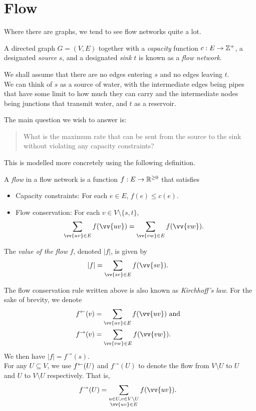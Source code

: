 \section{Flow}

Where there are graphs, we tend to see flow networks quite a lot.

\begin{fdef}
	A directed graph $G=(V,E)$ together with a \textit{capacity} function $c:E\to\mathbb{Z}^+$, a designated \textit{source} $s$, and a designated \textit{sink} $t$ is known as a \textit{flow network}.
\end{fdef}

We shall assume that there are no edges entering $s$ and no edges leaving $t$.\\
We can think of $s$ as a source of water, with the intermediate edges being pipes that have some limit to how much they can carry and the intermediate nodes being junctions that transmit water, and $t$ as a reservoir.

The main question we wish to answer is:
\begin{quote}
	What is the maximum rate that can be sent from the source to the sink without violating any capacity constraints?
\end{quote}

This is modelled more concretely using the following definition.

\begin{fdef}[Flow]
	A \textit{flow} in a flow network is a function $f:E\to\mathbb{R}^{\geq 0}$ that satisfies
	\begin{itemize}
		\item Capacity constraints: For each $e\in E$, $f(e)\leq c(e)$.
		\item Flow conservation: For each $v\in V\setminus\{s,t\}$,
		\[ \sum_{\vv{uv}\in E} f(\vv{uv}) = \sum_{\vv{vw}\in E} f(\vv{vw}). \]
	\end{itemize}
	The \textit{value of the flow} $f$, denoted $|f|$, is given by
	\[ |f| = \sum_{\vv{sv}\in E} f(\vv{sv}). \]
\end{fdef}

The flow conservation rule written above is also known as \textit{Kirchhoff's law}. For the sake of brevity, we denote
\begin{align*}
	f^{\ot}(v) &= \sum_{\vv{uv}\in E} f(\vv{uv}) \text{ and} \\
	f^{\to}(v) &= \sum_{\vv{vw}\in E} f(\vv{vw}).
\end{align*}
We then have $|f|=f^{\to}(s)$.\\
For any $U\subseteq V$, we use $f^{\leftarrow}(U)$ and $f^{\to}(U)$ to denote the flow from $V\setminus U$ to $U$ and $U$ to $V\setminus U$ respectively. That is,
\[ f^\to(U) = \sum_{\substack{u\in U, v\in V\setminus U \\ \vv{uv}\in E}} f(\vv{uv}). \]

